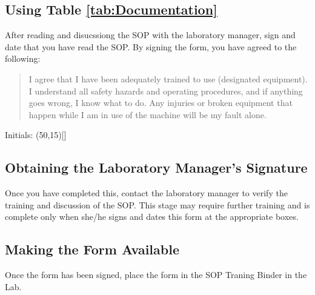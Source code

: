 \documentclass{article}\usepackage[]{graphicx}\usepackage[]{color}
\begin{document}
\subsection{Using Table \ref{tab:Documentation}}

After reading and disucssiong the SOP with the laboratory manager, sign and date that you have read the SOP. By signing the form, you have agreed to the following: 

\begin{quote} 
I agree that I have been adequately trained to use (designated equipment). I understand all safety hazards and operating procedures, and if anything goes wrong, I know what to do. Any injuries or broken equipment that happen while I am in use of the machine will be my fault alone.
\end{quote}

Initials: \framebox(50,15)[]{}

\subsection{Obtaining the Laboratory Manager's Signature}
Once you have completed this, contact the laboratory manager to verify the training and discussion of the SOP. This stage may require further training and is complete only when she/he signs and dates this form at the appropriate boxes. 

\subsection{Making the Form Available}

Once the form has been signed, place the form in the SOP Traning Binder in the Lab. 
\end{document}
